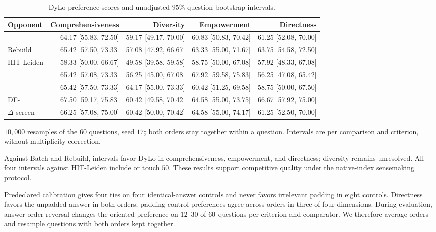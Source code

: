 \begin{table}[tb]\centering
\caption{DyLo preference scores and unadjusted $95\%$ question-bootstrap intervals.}
\label{tab:sensemaking-ci}
\footnotesize
\setlength{\tabcolsep}{0.25em}
\begin{tabular*}{\linewidth}{@{\extracolsep{\fill}}lrrrr@{}}
\toprule
Opponent & Comprehensiveness & Diversity & Empowerment & Directness \\
\midrule
\Batch{} & 64.17 [55.83, 72.50] & 59.17 [49.17, 70.00] & 60.83 [50.83, 70.42] & 61.25 [52.08, 70.00] \\
Rebuild & 65.42 [57.50, 73.33] & 57.08 [47.92, 66.67] & 63.33 [55.00, 71.67] & 63.75 [54.58, 72.50] \\
HIT-Leiden & 58.33 [50.00, 66.67] & 49.58 [39.58, 59.58] & 58.75 [50.00, 67.08] & 57.92 [48.33, 67.08] \\
\DynaMo{} & 65.42 [57.08, 73.33] & 56.25 [45.00, 67.08] & 67.92 [59.58, 75.83] & 56.25 [47.08, 65.42] \\
\QCA{} & 65.42 [57.50, 73.33] & 64.17 [55.00, 73.33] & 60.42 [51.25, 69.58] & 58.75 [50.00, 67.50] \\
DF-\Louvain{} & 67.50 [59.17, 75.83] & 60.42 [49.58, 70.42] & 64.58 [55.00, 73.75] & 66.67 [57.92, 75.00] \\
$\Delta$-screen & 66.25 [57.08, 75.00] & 60.42 [50.00, 70.42] & 64.58 [55.00, 74.17] & 61.25 [52.50, 70.00] \\
\bottomrule
\end{tabular*}
\par\smallskip\raggedright
$10{,}000$ resamples of the $60$ questions, seed $17$; both orders stay together within a question. Intervals are per comparison and criterion, without multiplicity correction.
\end{table}

Against Batch and Rebuild, intervals favor DyLo in comprehensiveness,
empowerment, and directness; diversity remains unresolved. All four
intervals against HIT-Leiden include or touch $50$. These results support
competitive quality under the native-index sensemaking protocol.

Predeclared calibration gives four ties on four identical-answer controls
and never favors irrelevant padding in eight controls. Directness favors
the unpadded answer in both orders; padding-control preferences agree across
orders in three of four dimensions. During evaluation, answer-order reversal
changes the oriented preference on $12$--$30$ of $60$ questions per criterion
and comparator. We therefore average orders and resample questions with
both orders kept together.

